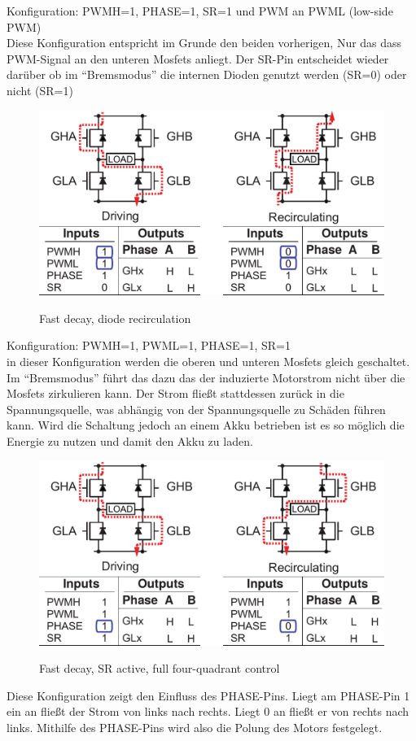 Konfiguration: PWMH=1, PHASE=1, SR=1 und PWM an PWML (low-side PWM)\\
Diese Konfiguration entspricht im Grunde den beiden vorherigen, Nur das dass PWM-Signal
an den unteren Mosfets anliegt. Der SR-Pin entscheidet wieder darüber ob im ``Bremsmodus''
die internen Dioden genutzt werden (SR=0) oder nicht (SR=1)




\begin{figure}[H]
\centering
\includegraphics[width=.8\textwidth]{3941_4.png}\\
\caption{Fast decay, diode recirculation}%
\label{fig:3941_4}
\end{figure}


Konfiguration: PWMH=1, PWML=1, PHASE=1, SR=1\\
in dieser Konfiguration werden die oberen und unteren Mosfets gleich geschaltet. Im
``Bremsmodus'' führt das dazu das der induzierte Motorstrom nicht über die Mosfets
zirkulieren kann. Der Strom fließt stattdessen zurück in die Spannungsquelle, was
abhängig von der Spannungsquelle zu Schäden führen kann. Wird die Schaltung jedoch an
einem Akku betrieben ist es so möglich die Energie zu nutzen und damit den Akku
zu laden.

\begin{figure}[H]
\centering
\includegraphics[width=.8\textwidth]{3941_5.png}\\
\caption{Fast decay, SR active, full four-quadrant control}%
\label{fig:3941_5}
\end{figure}

Diese Konfiguration zeigt den Einfluss des PHASE-Pins. Liegt am PHASE-Pin 1 ein an
fließt der Strom von links nach rechts. Liegt 0 an fließt er von rechts nach links.
Mithilfe des PHASE-Pins wird also die Polung des Motors festgelegt.


